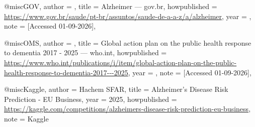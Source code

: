 @misc{GOV,
	author = {},
	title = {{A}lzheimer --- gov.br},
	howpublished = {\url{https://www.gov.br/saude/pt-br/assuntos/saude-de-a-a-z/a/alzheimer}},
	year = {},
	note = {[Accessed 01-09-2026]},
}

@misc{OMS,
	author = {},
	title = {{G}lobal action plan on the public health response to dementia 2017 - 2025 --- who.int},
	howpublished = {\url{https://www.who.int/publications/i/item/global-action-plan-on-the-public-health-response-to-dementia-2017---2025}},
	year = {},
	note = {[Accessed 01-09-2026]},
}

@misc{Kaggle,
	author = {Hachem SFAR},
	title = {Alzheimer's Disease Risk Prediction - EU Business},
	year = {2025},
	howpublished = {\url{https://kaggle.com/competitions/alzheimers-disease-risk-prediction-eu-business}},
	note = {Kaggle}
}